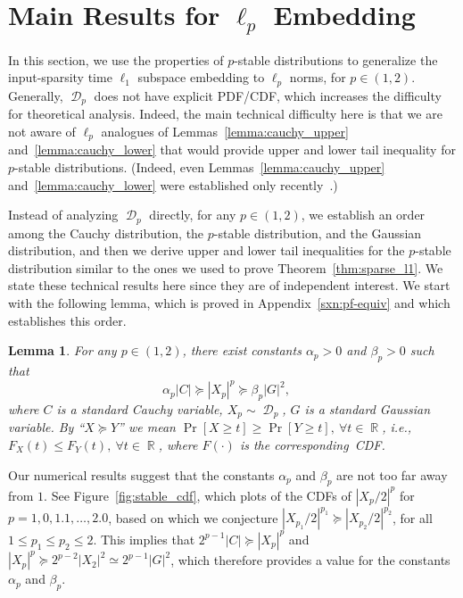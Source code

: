 \documentclass[11pt]{article}
\newtheorem{lemma}{Lemma}
\DeclareMathOperator{\R}{\mathbb{R}}
\DeclareMathOperator{\D}{\mathcal{D}}
\begin{document}
\section{Main Results for $\ell_p$ Embedding}
\label{sxn:lp} 

In this section, we use the properties of $p$-stable distributions to generalize
the input-sparsity time $\ell_1$ subspace embedding to $\ell_p$ norms, for $p
\in (1, 2)$. 
Generally, $\D_p$ does not have explicit PDF/CDF, which increases the difficulty
for theoretical analysis. 
Indeed, the main technical difficulty here is that we are not aware of $\ell_p$
analogues of Lemmas~\ref{lemma:cauchy_upper} and~\ref{lemma:cauchy_lower} that
would provide upper and lower tail inequality for $p$-stable distributions.
(Indeed, even Lemmas~\ref{lemma:cauchy_upper} and~\ref{lemma:cauchy_lower} were
established only recently~\cite{CDMMMW13_SODA}.)

Instead of analyzing $\D_p$ directly, for any $p \in (1, 2)$, we
establish an order among the Cauchy distribution, the $p$-stable distribution,
and the Gaussian distribution, and then we derive upper and lower tail
inequalities for the $p$-stable distribution similar to the ones we used to
prove Theorem~\ref{thm:sparse_l1}.
We state these technical results here since they are of independent interest.
We start with the following lemma, which is proved in
Appendix~\ref{sxn:pf-equiv} and which establishes this order.

\begin{lemma}
  \label{lemma:equiv}
  For any $p \in (1, 2)$, there exist constants $\alpha_p > 0$ and $\beta_p > 0$
  such that
  \begin{equation*}
    \alpha_p |C| \succeq |X_p|^p \succeq \beta_p |G|^2, \quad 
  \end{equation*}
  where $C$ is a standard Cauchy variable, $X_p \sim \D_p$, $G$ is a standard
  Gaussian variable.
  By ``$X \succeq Y$'' we mean $\Pr[X \geq t] \geq \Pr[Y \geq t],\ \forall t\in
  \R$, i.e., $F_X(t) \leq F_Y(t),\ \forall t \in \R$, where $F(\cdot)$ is the
  corresponding~CDF.
\end{lemma}

\noindent
Our numerical results suggest that the constants $\alpha_p$ and $\beta_p$ 
are not too far away from $1$.
See Figure~\ref{fig:stable_cdf}, which plots of the CDFs of $|X_p/2|^p$ for 
$p=1,0, 1.1, \ldots, 2.0$, based on which we conjecture 
$|X_{p_1}/2|^{p_1} \succeq |X_{p_2}/2|^{p_2}$, for all 
$1 \leq p_1 \leq p_2 \leq 2$.
This implies that $2^{p-1} |C| \succeq |X_p|^p$ and 
$|X_p|^p \succeq 2^{p-2} |X_2|^2 \simeq 2^{p-1} |G|^2$, 
which therefore provides a value for the constants $\alpha_p$ and $\beta_p$.
\end{document}
